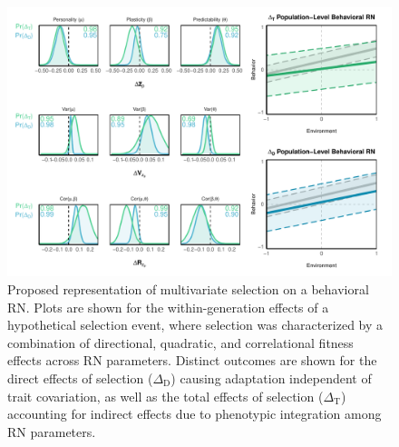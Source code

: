 \documentclass{article}
\begin{document}
\begin{figure}
\hspace*{-1.6cm}
\includegraphics[scale=0.73]{fig3_2.pdf}
\caption{Proposed representation of multivariate selection on a behavioral RN. Plots are shown for the within-generation effects of a hypothetical selection event, where selection was characterized by a combination of directional, quadratic, and correlational fitness effects across RN parameters. Distinct outcomes are shown for the direct effects of selection ($\Delta_{\mathrm{D}}$) causing adaptation independent of trait covariation, as well as the total effects of selection ($\Delta_{\mathrm{T}}$) accounting for indirect effects due to phenotypic integration among RN parameters.  \\ \\ 
}
\end{figure}
\end{document}
